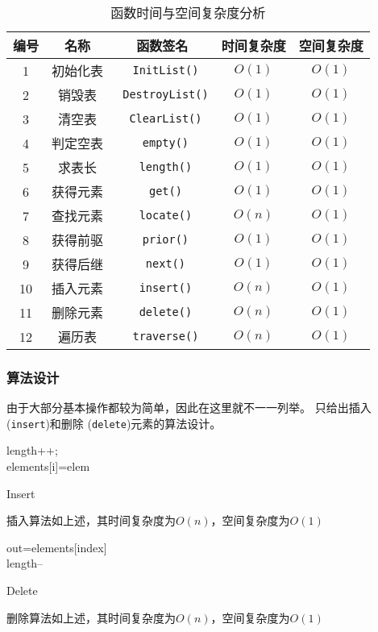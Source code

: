 \begin{table}[h]
\centering
\caption{函数时间与空间复杂度分析}
\label{tab:timeandspace1}
\begin{tabular}{@{}ccccc@{}}
\toprule
编号                          & 名称  & 函数签名 & 时间复杂度 & 空间复杂度 \\ \toprule
    \multicolumn{1}{c|}{1}  & 初始化表 & \texttt{ InitList()} & $O(1)$ &  $O(1)$ \\
    \multicolumn{1}{c|}{2}  & 销毁表& \texttt{ DestroyList()} & $O(1)$ &  $O(1)$ \\
    \multicolumn{1}{c|}{3}  & 清空表& \texttt{ ClearList()} & $O(1)$ &  $O(1)$   \\
    \multicolumn{1}{c|}{4}  & 判定空表& \texttt{ empty()} & $O(1)$ &  $O(1)$     \\
    \multicolumn{1}{c|}{5}  & 求表长 & \texttt{ length()} & $O(1)$ &  $O(1)$     \\
    \multicolumn{1}{c|}{6}  & 获得元素 & \texttt{ get()} & $O(1)$ &  $O(1)$      \\
    \multicolumn{1}{c|}{7}  & 查找元素 & \texttt{ locate()} & $O(n)$ &  $O(1)$   \\
    \multicolumn{1}{c|}{8}  & 获得前驱 & \texttt{ prior()} & $O(1)$ &  $O(1)$    \\
    \multicolumn{1}{c|}{9}  & 获得后继 & \texttt{ next()} & $O(1)$ &  $O(1)$     \\
    \multicolumn{1}{c|}{10}  & 插入元素 & \texttt{ insert()} & $O(n)$ &  $O(1)$  \\
    \multicolumn{1}{c|}{11}  & 删除元素 & \texttt{ delete()} & $O(n)$ &  $O(1)$  \\
    \multicolumn{1}{c|}{12}  & 遍历表 & \texttt{ traverse()}   & $O(n)$ & $O(1)$ \\ \bottomrule
\end{tabular}
\end{table}
\subsubsection{算法设计}
由于大部分基本操作都较为简单，因此在这里就不一一列举。
只给出插入 (\texttt{insert})和删除 (\texttt{delete})元素的算法设计。
\newline
\begin{algorithm}[H]
    \SetAlgoLined
    length++;
    \\
    elements[i]=elem
\caption{Insert}\label{alg:insert}
\end{algorithm}
插入算法如上述，其时间复杂度为$O(n)$，空间复杂度为$O(1)$
\begin{algorithm}
    \SetAlgoLined
    out=elements[index]
    \\
    length--
\caption{Delete}\label{alg:delete}
\end{algorithm}
\newline
删除算法如上述，其时间复杂度为$O(n)$，空间复杂度为$O(1)$
